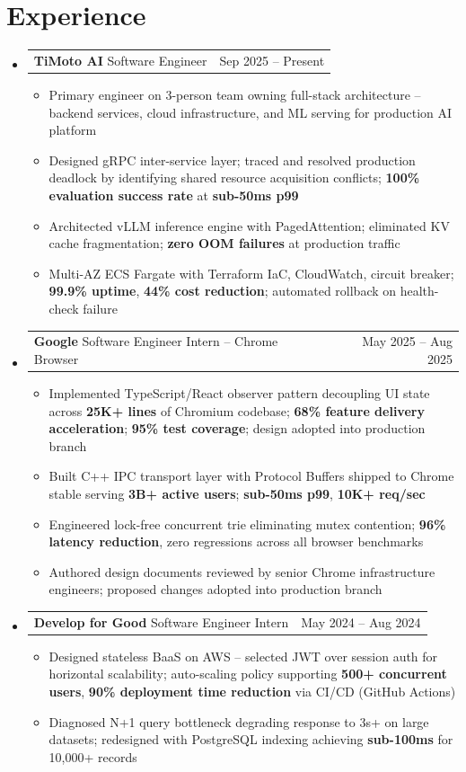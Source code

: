\documentclass[letterpaper,11pt]{article}
\makeatletter
\newcommand{\resumeItem}[1]{\item\small{{#1 \vspace{-2pt}}}}
\newcommand{\resumeSubheadingShortSplit}[3]{%
  \vspace{-2pt}\item
    \begin{tabular*}{0.98\textwidth}[t]{l@{\extracolsep{\fill}}r}
      {\normalsize\textbf{#1}} \textbar{} {\normalsize #2} & {\normalsize #3} \\
    \end{tabular*}\vspace{-7pt}
}
\newcommand{\resumeSubHeadingListStart}{\begin{itemize}[leftmargin=0.15in, label={}]}
\newcommand{\resumeSubHeadingListEnd}{\end{itemize}}
\newcommand{\resumeItemListStart}{\begin{itemize}}
\newcommand{\resumeItemListEnd}{\end{itemize}\vspace{-5pt}}
\makeatother
\begin{document}
\section{Experience}
  \resumeSubHeadingListStart
    \resumeSubheadingShortSplit{TiMoto AI}{Software Engineer}{Sep 2025 -- Present}
      \resumeItemListStart
        \resumeItem{Primary engineer on 3-person team owning full-stack architecture -- backend services, cloud infrastructure, and ML serving for production AI platform}
        \resumeItem{Designed gRPC inter-service layer; traced and resolved production deadlock by identifying shared resource acquisition conflicts; \textbf{100\% evaluation success rate} at \textbf{sub-50ms p99}}
        \resumeItem{Architected vLLM inference engine with PagedAttention; eliminated KV cache fragmentation; \textbf{zero OOM failures} at production traffic}
        \resumeItem{Multi-AZ ECS Fargate with Terraform IaC, CloudWatch, circuit breaker; \textbf{99.9\% uptime}, \textbf{44\% cost reduction}; automated rollback on health-check failure}
      \resumeItemListEnd
    \resumeSubheadingShortSplit{Google}{Software Engineer Intern -- Chrome Browser}{May 2025 -- Aug 2025}
      \resumeItemListStart
        \resumeItem{Implemented TypeScript/React observer pattern decoupling UI state across \textbf{25K+ lines} of Chromium codebase; \textbf{68\% feature delivery acceleration}; \textbf{95\% test coverage}; design adopted into production branch}
        \resumeItem{Built C++ IPC transport layer with Protocol Buffers shipped to Chrome stable serving \textbf{3B+ active users}; \textbf{sub-50ms p99}, \textbf{10K+ req/sec}}
        \resumeItem{Engineered lock-free concurrent trie eliminating mutex contention; \textbf{96\% latency reduction}, zero regressions across all browser benchmarks}
        \resumeItem{Authored design documents reviewed by senior Chrome infrastructure engineers; proposed changes adopted into production branch}
      \resumeItemListEnd
    \resumeSubheadingShortSplit{Develop for Good}{Software Engineer Intern}{May 2024 -- Aug 2024}
      \resumeItemListStart
        \resumeItem{Designed stateless BaaS on AWS -- selected JWT over session auth for horizontal scalability; auto-scaling policy supporting \textbf{500+ concurrent users}, \textbf{90\% deployment time reduction} via CI/CD (GitHub Actions)}
        \resumeItem{Diagnosed N+1 query bottleneck degrading response to 3s+ on large datasets; redesigned with PostgreSQL indexing achieving \textbf{sub-100ms} for 10,000+ records}
      \resumeItemListEnd
  \resumeSubHeadingListEnd
\end{document}
